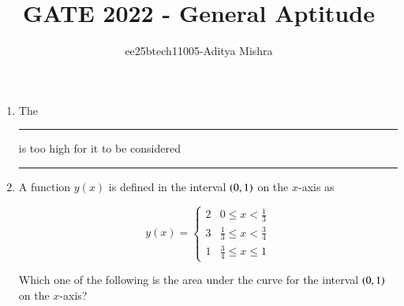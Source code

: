 

\title{GATE 2022 - General Aptitude}
\author{ee25btech11005-Aditya Mishra}
\maketitle

{\let\newpage\relax\maketitle}

\renewcommand{\thefigure}{\theenumi}
\renewcommand{\thetable}{\theenumi}
\setlength{\intextsep}{10pt} 

\begin{enumerate}

\item The \rule{2cm}{0.4pt} is too high for it to be considered \rule{2cm}{0.4pt}  

\begin{enumerate}
\end{enumerate}

\hfill{}

\item A function $y(x)$ is defined in the interval $\left(0,1\right)$ on the $x$-axis as  

\[
y(x) = 
\begin{cases} 
2 & 0 \leq x < \tfrac{1}{3} \\
3 & \tfrac{1}{3} \leq x < \tfrac{3}{4} \\
1 & \tfrac{3}{4} \leq x \leq 1
\end{cases}
\]

Which one of the following is the area under the curve for the interval $\left(0,1\right)$ on the $x$-axis?  

\begin{enumerate}
\end{enumerate}


\end{enumerate}
